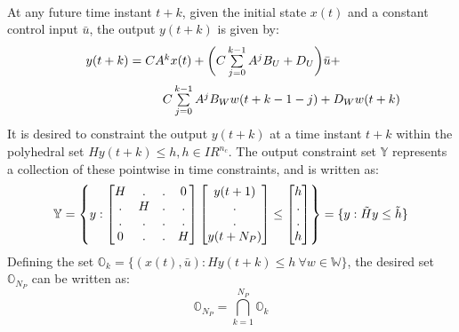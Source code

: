 \documentclass[letterpaper, 10 pt, conference]{ieeeconf}  %
\begin{document}
  \\
  At any future time instant $t+k$, given the initial state $x(t)$ and a constant control input $\bar{u}$, the output $y(t+k)$ is given by:
  	\begin{equation}
  	\hspace{-30pt}
  	\begin{aligned}
  	\begin{matrix}
  	y(t+k) = CA^{k}x(t) + \bigg( C\sum\limits_{j=0}^{k-1}A^{j}B_U + D_{U} \bigg)\bar{u} + \vspace{5pt}\\  \hspace{110pt} C\sum\limits_{j=0}^{k-1}A^jB_Ww(t+k-1-j) + D_{W} w(t+k)
  	\end{matrix}
  	\end{aligned}
  	\label{elongform}
  	\end{equation}
  	It is desired to constraint the output $y(t+k)$ at a time instant $t+k$ within the polyhedral set $Hy(t+k) \leq h, h \in I\!R^{n_c}$.
  The output constraint set $\mathbb{Y}$ represents a collection of these pointwise in time constraints, and is written as:
  \begin{equation*}
  \small
  \mathbb{Y}=\begin{Bmatrix}y:
  \begin{bmatrix}
  H & . & . & 0 \\
  . & H & . & .\\
  . & . & . & . \\
  0 & . & . & H
  \end{bmatrix}
  \begin{bmatrix}
  y(t+1) \\ . \\ . \\ y(t+N_P)
  \end{bmatrix}
  \leq \begin{bmatrix}
  h \\ . \\ . \\  h
  \end{bmatrix}
  \end{Bmatrix} = 
  \{ y: \tilde{H} y \leq \tilde{h} \}
  \end{equation*}
  \iffalse
  Defining the set $\mathbb{O}_k=\{(x(t),\bar{u}):Hy(t+k)\leq h\ \forall w \in \mathbb{W}\}$, the desired set $\mathbb{O}_{N_P}$ can be written as:
  \begin{equation*}
  \mathbb{O}_{N_P}=\bigcap^{N_P}_{k=1} \mathbb{O}_k
  \end{equation*}
\end{document}

